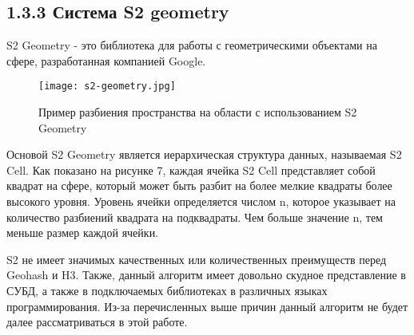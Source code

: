 \subsection{1.3.3 Система S2 geometry}

S2 Geometry - это библиотека для работы с геометрическими объектами на сфере, разработанная компанией Google. 
\par\vspace{1em}
\begin{figure}[H]
    \centering
    \texttt{[image: s2-geometry.jpg]}
    \caption{Пример разбиения пространства на области с использованием S2 Geometry}
\end{figure}
\par\vspace{1em}

Основой S2 Geometry является иерархическая структура данных, называемая S2 Cell. Как показано на рисунке 7, каждая ячейка S2 Cell представляет собой квадрат на сфере, который может быть разбит на более мелкие квадраты более высокого уровня. Уровень ячейки определяется числом n, которое указывает на количество разбиений квадрата на подквадраты. Чем больше значение n, тем меньше размер каждой ячейки.

S2 не имеет значимых качественных или количественных преимуществ перед Geohash и H3. Также, данный алгоритм имеет довольно скудное представление в СУБД, а также в подключаемых библиотеках в различных языках программирования. 
Из-за перечисленных выше причин данный алгоритм не будет далее рассматриваться в этой работе. 